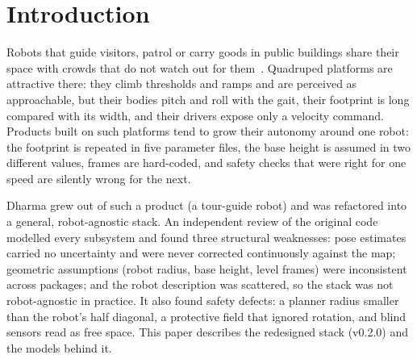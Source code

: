\section{Introduction}
\label{sec:intro}

Robots that guide visitors, patrol or carry goods in public buildings share their space with
crowds that do not watch out for them~\cite{burgard1999museum,triebel2016spencer,
kruse2013humanaware}. Quadruped platforms are attractive there: they climb thresholds and
ramps and are perceived as approachable, but their bodies pitch and roll with the gait, their
footprint is long compared with its width, and their drivers expose only a velocity command.
Products built on such platforms tend to grow their autonomy around one robot: the footprint is
repeated in five parameter files, the base height is assumed in two different values, frames
are hard-coded, and safety checks that were right for one speed are silently wrong for the next.

Dharma grew out of such a product (a tour-guide robot) and was refactored into a general,
robot-agnostic stack. An independent review of the original code modelled every subsystem and
found three structural weaknesses: pose estimates carried no uncertainty and were never
corrected continuously against the map; geometric assumptions (robot radius, base height,
level frames) were inconsistent across packages; and the robot description was scattered, so
the stack was not robot-agnostic in practice. It also found safety defects: a planner radius
smaller than the robot's half diagonal, a protective field that ignored rotation, and blind
sensors read as free space. This paper describes the redesigned stack (v0.2.0) and the models
behind it.

